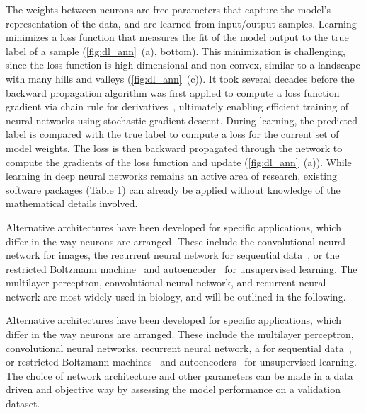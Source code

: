 The weights between neurons are free parameters that capture the model's representation of the data, and are learned from input/output samples. Learning minimizes a loss function that measures the fit of the model output to the true label of a sample (\autoref{fig:dl_ann}~(a), bottom). This minimization is challenging, since the loss function is high dimensional and non-convex, similar to a landscape with many hills and valleys (\autoref{fig:dl_ann}~(c)). It took several decades before the backward propagation algorithm was first applied to compute a loss function gradient via chain rule for derivatives~\citep{rumelhart_learning_1988}, ultimately enabling efficient training of neural networks using stochastic gradient descent. During learning, the predicted label is compared with the true label to compute a loss for the current set of model weights. The loss is then backward propagated through the network to compute the gradients of the loss function and update (\autoref{fig:dl_ann}~(a)). While learning in deep neural networks remains an active area of research, existing software packages (Table 1) can already be applied without knowledge of the mathematical details involved.

Alternative architectures have been developed for specific applications, which differ in the way neurons are arranged. These include the convolutional neural network for images, the recurrent neural network for sequential data~\citep{lipton_critical_2015,sutskever_training_2013}, or the restricted Boltzmann machine~\citep{hinton_practical_2012,salakhutdinov_efficient_2010} and autoencoder~\citep{alain_regularized_2012,hinton_reducing_2006,kingma_auto-encoding_2013} for unsupervised learning. The multilayer perceptron, convolutional neural network, and recurrent neural network are most widely used in biology, and will be outlined in the following.


Alternative architectures have been developed for specific applications, which differ in the way neurons are arranged. These include the multilayer perceptron, convolutional neural networks, recurrent neural network, a for sequential data~\citep{lipton_critical_2015,sutskever_training_2013}, or restricted Boltzmann machines~\citep{hinton_practical_2012,salakhutdinov_efficient_2010} and autoencoders~\citep{alain_regularized_2012,hinton_reducing_2006,kingma_auto-encoding_2013} for unsupervised learning. The choice of network architecture and other parameters can be made in a data driven and objective way by assessing the model performance on a validation dataset.

